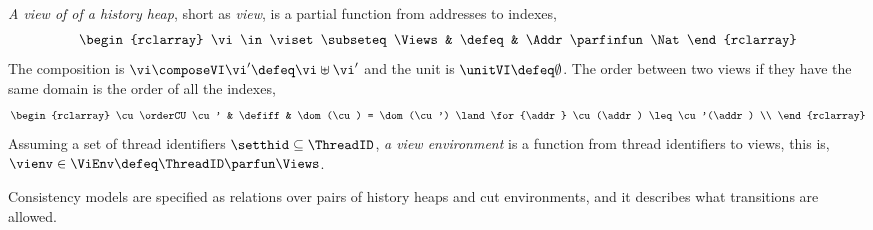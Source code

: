 \begin{defn}[Views]
\label{def:cuts}
\label{def:views}
\emph{A view of of a history heap}, short as \emph{view}, is a partial function from addresses to indexes,
\[
\begin{rclarray}
    \vi \in \viset \subseteq \Views & \defeq & \Addr \parfinfun \Nat
\end{rclarray}
\]                                                                     
The composition is \( \vi \composeVI \vi' \defeq \vi \uplus \vi'\) and the unit is \( \unitVI \defeq \emptyset\).
The order between two views if they have the same domain is the order of all the indexes, 
\[
\begin{rclarray}
    \cu \orderCU \cu' & \defiff & \dom(\cu) = \dom(\cu') \land \for{\addr} \cu(\addr) \leq \cu'(\addr) \\
\end{rclarray}
\]
Assuming a set of thread identifiers \( \setthid \subseteq \ThreadID \), \emph{a view environment} is a function from thread identifiers to views, this is, \( \vienv \in \ViEnv \defeq \ThreadID \parfun \Views \).
\end{defn}

Consistency models are specified as relations over pairs of history heaps and cut environments, and it describes what transitions are allowed.

